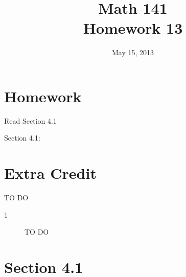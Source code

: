 \documentclass{exam}
\date{May 15, 2013}
\author{}
\title{Math 141 \\ Homework 13}
\begin{document}
\maketitle


\section{Homework}

\begin{itemize*}
  \item Read Section 4.1 
  \item Section 4.1: 
\end{itemize*}

\section{Extra Credit}
  TO DO 

\ifprintanswers
  \pagebreak

  \begin{description}
    \item[1] TO DO

  \end{description}

  \pagebreak

  \section{Section 4.1}
\end{document}
